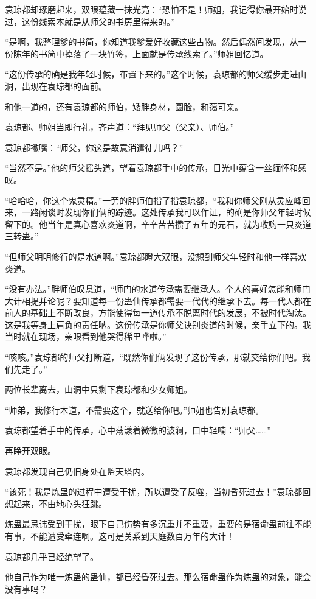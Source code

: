 \begin{this_body}
袁琼都却琢磨起来，双眼蕴藏一抹光亮：“恐怕不是！师姐，我记得你最开始时说过，这份线索本就是从师父的书房里得来的。”

“是啊，我整理爹的书简，你知道我爹爱好收藏这些古物。然后偶然间发现，从一份陈年的书简中掉落了一块竹签，上面就是传承线索了。”师姐回忆道。

“这份传承的确是我年轻时候，布置下来的。”这个时候，袁琼都的师父缓步走进山洞，出现在袁琼都的面前。

和他一道的，还有袁琼都的师伯，矮胖身材，圆脸，和蔼可亲。

袁琼都、师姐当即行礼，齐声道：“拜见师父（父亲）、师伯。”

袁琼都撇嘴：“师父，你这是故意消遣徒儿吗？”

“当然不是。”他的师父摇头道，望着袁琼都手中的传承，目光中蕴含一丝缅怀和感叹。

“哈哈哈，你这个鬼灵精。”一旁的胖师伯指了指袁琼都，“我和你师父刚从灵应峰回来，一路闲谈时发现你们俩的踪迹。这处传承我可以作证，的确是你师父年轻时候留下的。他当年是真心喜欢炎道啊，辛辛苦苦攒了五年的元石，就为收购一只炎道三转蛊。”

“但师父明明修行的是水道啊。”袁琼都瞪大双眼，没想到师父年轻时和他一样喜欢炎道。

“没有办法。”胖师伯叹息道，“师门的水道传承需要继承人。个人的喜好怎能和师门大计相提并论呢？要知道每一份蛊仙传承都需要一代代的继承下去。每一代人都在前人的基础上不断改良，方能使得每一道传承不脱离时代的发展，不被时代淘汰。这是我等身上肩负的责任呐。这份传承是你师父诀别炎道的时候，亲手立下的。我当时就在现场，亲眼看到他哭得稀里哗啦。”

“咳咳。”袁琼都的师父打断道，“既然你们俩发现了这份传承，那就交给你们吧。我们先走了。”

两位长辈离去，山洞中只剩下袁琼都和少女师姐。

“师弟，我修行木道，不需要这个，就送给你吧。”师姐也告别袁琼都。

袁琼都望着手中的传承，心中荡漾着微微的波澜，口中轻喃：“师父……”

再睁开双眼。

袁琼都发现自己仍旧身处在监天塔内。

“该死！我是炼蛊的过程中遭受干扰，所以遭受了反噬，当初昏死过去！”袁琼都回想起来，不由地心头狂跳。

炼蛊最忌讳受到干扰，眼下自己伤势有多沉重并不重要，重要的是宿命蛊前往不能有事，不能遭受牵连啊。这可是关系到天庭数百万年的大计！

袁琼都几乎已经绝望了。

他自己作为唯一炼蛊的蛊仙，都已经昏死过去。那么宿命蛊作为炼蛊的对象，能会没有事吗？


\end{this_body}

